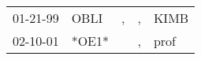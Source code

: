 \begin{supertabular}{p{0.07\textwidth}p{0.06\textwidth}p{0.02\textwidth}p{0.02\textwidth}p{0.06\textwidth}}
 01-21-99\textsuperscript{} &  OBLI\textsuperscript{} &  , &  , &  KIMB\textsuperscript{} \\
 02-10-01\textsuperscript{} &                   *OE1* &    &  , &  prof\textsuperscript{} \\
\end{supertabular}

